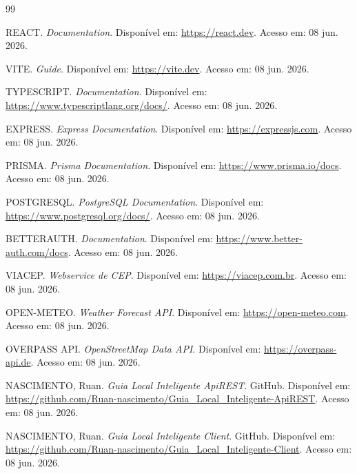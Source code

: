 \documentclass[
    12pt,
    oneside,
    openright,
    a4paper,
    english,
    brazil
]{abntex2}
\begin{document}
\begin{thebibliography}{99}

REACT. \textit{Documentation}. Disponível em: \url{https://react.dev}. Acesso em: 08 jun. 2026.

VITE. \textit{Guide}. Disponível em: \url{https://vite.dev}. Acesso em: 08 jun. 2026.

TYPESCRIPT. \textit{Documentation}. Disponível em: \url{https://www.typescriptlang.org/docs/}. Acesso em: 08 jun. 2026.

EXPRESS. \textit{Express Documentation}. Disponível em: \url{https://expressjs.com}. Acesso em: 08 jun. 2026.

PRISMA. \textit{Prisma Documentation}. Disponível em: \url{https://www.prisma.io/docs}. Acesso em: 08 jun. 2026.

POSTGRESQL. \textit{PostgreSQL Documentation}. Disponível em: \url{https://www.postgresql.org/docs/}. Acesso em: 08 jun. 2026.

BETTERAUTH. \textit{Documentation}. Disponível em: \url{https://www.better-auth.com/docs}. Acesso em: 08 jun. 2026.

VIACEP. \textit{Webservice de CEP}. Disponível em: \url{https://viacep.com.br}. Acesso em: 08 jun. 2026.

OPEN-METEO. \textit{Weather Forecast API}. Disponível em: \url{https://open-meteo.com}. Acesso em: 08 jun. 2026.

OVERPASS API. \textit{OpenStreetMap Data API}. Disponível em: \url{https://overpass-api.de}. Acesso em: 08 jun. 2026.

NASCIMENTO, Ruan. \textit{Guia Local Inteligente ApiREST}. GitHub. Disponível em: \url{https://github.com/Ruan-nascimento/Guia_Local_Inteligente-ApiREST}. Acesso em: 08 jun. 2026.

NASCIMENTO, Ruan. \textit{Guia Local Inteligente Client}. GitHub. Disponível em: \url{https://github.com/Ruan-nascimento/Guia_Local_Inteligente-Client}. Acesso em: 08 jun. 2026.

\end{thebibliography}

\end{document}
